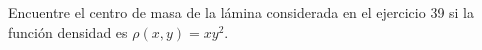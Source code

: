 \item Encuentre el centro de masa de la lámina considerada en el ejercicio 39 si la función densidad es $\rho(x, y) = xy^2$.
